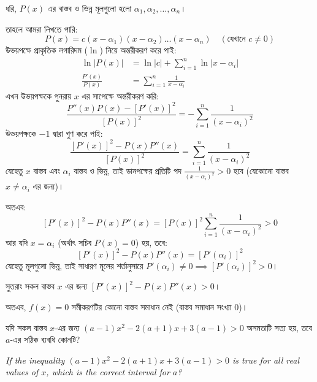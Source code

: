 \documentclass[12pt, a4paper]{article}
\begin{document}
\begin{tcolorbox}[solutionbox={সমাধান (Solution)}]
    \noindent
    ধরি, $P(x)$ এর বাস্তব ও ভিন্ন মূলগুলো হলো $\alpha_1, \alpha_2, \dots, \alpha_n$। 
    
    তাহলে আমরা লিখতে পারি:
    \[ P(x) = c(x-\alpha_1)(x-\alpha_2)\dots(x-\alpha_n) \quad (\text{যেখানে } c \ne 0) \]
    উভয়পক্ষে প্রাকৃতিক লগারিদম ($\ln$) নিয়ে অন্তরীকরণ করে পাই:
    \begin{align*}
        \ln|P(x)| &= \ln|c| + \sum_{i=1}^n \ln|x-\alpha_i| \\
        \frac{P'(x)}{P(x)} &= \sum_{i=1}^n \frac{1}{x-\alpha_i}
    \end{align*}
    এখন উভয়পক্ষকে পুনরায় $x$ এর সাপেক্ষে অন্তরীকরণ করি:
    \[ \frac{P''(x)P(x) - [P'(x)]^2}{[P(x)]^2} = -\sum_{i=1}^n \frac{1}{(x-\alpha_i)^2} \]
    উভয়পক্ষকে $-1$ দ্বারা গুণ করে পাই:
    \[ \frac{[P'(x)]^2 - P(x)P''(x)}{[P(x)]^2} = \sum_{i=1}^n \frac{1}{(x-\alpha_i)^2} \]
    যেহেতু $x$ বাস্তব এবং $\alpha_i$ বাস্তব ও ভিন্ন, তাই ডানপক্ষের প্রতিটি পদ $\frac{1}{(x-\alpha_i)^2} > 0$ হবে (যেকোনো বাস্তব $x \ne \alpha_i$ এর জন্য)। 
    
    অতএব:
    \[ [P'(x)]^2 - P(x)P''(x) = [P(x)]^2 \sum_{i=1}^n \frac{1}{(x-\alpha_i)^2} > 0 \]
    আর যদি $x = \alpha_i$ (অর্থাৎ সচিব $P(x) = 0$) হয়, তবে:
    \[ [P'(x)]^2 - P(x)P''(x) = [P'(\alpha_i)]^2 \]
    যেহেতু মূলগুলো ভিন্ন, তাই সাধারণ মূলের শর্তানুসারে $P'(\alpha_i) \ne 0 \implies [P'(\alpha_i)]^2 > 0$। 
    
    সুতরাং সকল বাস্তব $x$ এর জন্য $[P'(x)]^2 - P(x)P''(x) > 0$। 
    
    অতএব, $f(x) = 0$ সমীকরণটির কোনো বাস্তব সমাধান নেই (বাস্তব সমাধান সংখ্যা $0$)।
\end{tcolorbox}
\begin{tcolorbox}[questionbox={প্রশ্ন (Question) 32}]
    \noindent
    যদি সকল বাস্তব $x$-এর জন্য $(a-1)x^2 - 2(a+1)x + 3(a-1) > 0$ অসমতাটি সত্য হয়, তবে $a$-এর সঠিক ব্যবধি কোনটি?
    
    \vspace{0.8em}
    \begin{english}
    \noindent\textit{\color{darkgray}
    If the inequality $(a-1)x^2 - 2(a+1)x + 3(a-1) > 0$ is true for all real values of $x$, which is the correct interval for $a$?
    }
    \end{english}
\end{tcolorbox}
\end{document}
